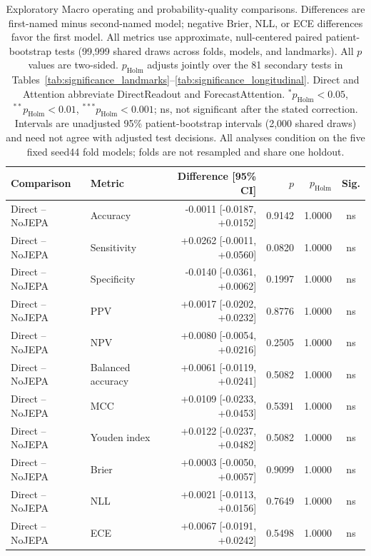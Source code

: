 \begin{table}[t]
\centering
\small
\caption{Exploratory Macro operating and probability-quality comparisons. Differences are first-named minus second-named model; negative Brier, NLL, or ECE differences favor the first model. All metrics use approximate, null-centered paired patient-bootstrap tests (99,999 shared draws across folds, models, and landmarks). All $p$ values are two-sided. $p_{\mathrm{Holm}}$ adjusts jointly over the 81 secondary tests in Tables~\ref{tab:significance_landmarks}--\ref{tab:significance_longitudinal}. Direct and Attention abbreviate DirectReadout and ForecastAttention. $^{*}p_{\mathrm{Holm}}<0.05$, $^{**}p_{\mathrm{Holm}}<0.01$, $^{***}p_{\mathrm{Holm}}<0.001$; ns, not significant after the stated correction. Intervals are unadjusted 95\% patient-bootstrap intervals (2,000 shared draws) and need not agree with adjusted test decisions. All analyses condition on the five fixed seed44 fold models; folds are not resampled and share one holdout.}
\label{tab:significance_extended}
\begin{tabular}{llrrrc}
\toprule
Comparison & Metric & Difference [95\% CI] & $p$ & $p_{\mathrm{Holm}}$ & Sig. \\
\midrule
Direct -- NoJEPA & Accuracy & -0.0011 [-0.0187, +0.0152] & 0.9142 & 1.0000 & ns \\
Direct -- NoJEPA & Sensitivity & +0.0262 [-0.0011, +0.0560] & 0.0820 & 1.0000 & ns \\
Direct -- NoJEPA & Specificity & -0.0140 [-0.0361, +0.0062] & 0.1997 & 1.0000 & ns \\
Direct -- NoJEPA & PPV & +0.0017 [-0.0202, +0.0232] & 0.8776 & 1.0000 & ns \\
Direct -- NoJEPA & NPV & +0.0080 [-0.0054, +0.0216] & 0.2505 & 1.0000 & ns \\
Direct -- NoJEPA & Balanced accuracy & +0.0061 [-0.0119, +0.0241] & 0.5082 & 1.0000 & ns \\
Direct -- NoJEPA & MCC & +0.0109 [-0.0233, +0.0453] & 0.5391 & 1.0000 & ns \\
Direct -- NoJEPA & Youden index & +0.0122 [-0.0237, +0.0482] & 0.5082 & 1.0000 & ns \\
Direct -- NoJEPA & Brier & +0.0003 [-0.0050, +0.0057] & 0.9099 & 1.0000 & ns \\
Direct -- NoJEPA & NLL & +0.0021 [-0.0113, +0.0156] & 0.7649 & 1.0000 & ns \\
Direct -- NoJEPA & ECE & +0.0067 [-0.0191, +0.0242] & 0.5498 & 1.0000 & ns \\

\end{tabular}
\end{table}
